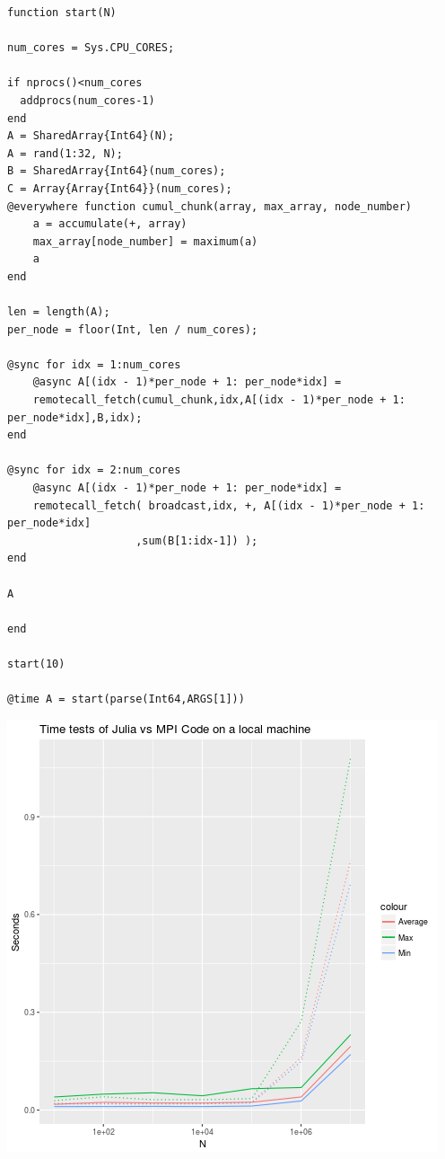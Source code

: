 \documentclass[10pt]{article}
\begin{document}
\begin{lstlisting}
function start(N)

num_cores = Sys.CPU_CORES;

if nprocs()<num_cores
  addprocs(num_cores-1)
end
A = SharedArray{Int64}(N);
A = rand(1:32, N);
B = SharedArray{Int64}(num_cores);
C = Array{Array{Int64}}(num_cores);
@everywhere function cumul_chunk(array, max_array, node_number)
    a = accumulate(+, array)
    max_array[node_number] = maximum(a)
    a
end

len = length(A);
per_node = floor(Int, len / num_cores);

@sync for idx = 1:num_cores
    @async A[(idx - 1)*per_node + 1: per_node*idx] = 
    remotecall_fetch(cumul_chunk,idx,A[(idx - 1)*per_node + 1: per_node*idx],B,idx);	
end

@sync for idx = 2:num_cores
    @async A[(idx - 1)*per_node + 1: per_node*idx] = 
    remotecall_fetch( broadcast,idx, +, A[(idx - 1)*per_node + 1: per_node*idx] 
    				,sum(B[1:idx-1]) );	
end

A

end

start(10)

@time A = start(parse(Int64,ARGS[1]))
\end{lstlisting}

\includegraphics[width=\textwidth]{plot.png}
\end{document}
